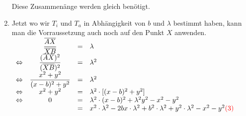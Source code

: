 \begin{small}
\begin{Beweis}
\begin{enumerate}
      Diese Zusammenänge werden gleich benötigt.

    \item
      Jetzt wo wir $T_{i}$ und $T_{a}$ in Abhängigkeit von $b$ und $\lambda$ bestimmt haben, kann man die Vorraussetzung auch noch auf den Punkt $X$ anwenden.\\
      $\begin{array}{rccll}
                          & \dfrac{\overline{AX}}{\overline{XB}}        & = & \lambda \\
        \Leftrightarrow & \dfrac{(\overline{AX})^2}{(\overline{XB})^2}& = & \lambda^2 \\
        \Leftrightarrow & \dfrac{x^2+y^2}{(x-b)^2+y^2}                & = & \lambda^2 \\
        \Leftrightarrow & x^2+y^2                                     & = & \lambda^2 \cdot [(x-b)^2+y^2] \\
        \Leftrightarrow & 0                                           & = & \lambda^2 \cdot (x-b)^2 +\lambda^2 y^2 -x^2 -y^2 \\
                          &                                               & = & x^2\cdot \lambda^2 - 2bx\cdot \lambda^2 +b^2\cdot \lambda^2 +y^2\cdot \lambda^2 -x^2-y^2  \textcolor{red}{(3)}
      \end{array}$



\end{enumerate}
\end{Beweis}
\end{small}

